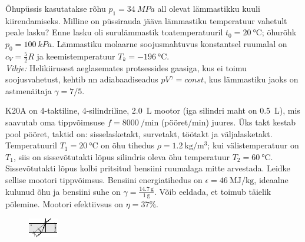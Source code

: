 \documentclass[10pt]{article}
\begin{document}

Õhupüssis kasutatakse rõhu $p_1=\SI{34}{MPa}$ all olevat lämmastikku kuuli kiirendamiseks. Milline on püssirauda jääva lämmastiku temperatuur vahetult peale lasku? Enne lasku oli surulämmastik toatemperatuuril $t_0=\SI{20}\celsius$; õhurõhk $p_0=\SI{100}{kPa}$. Lämmastiku molaarne soojusmahtuvus konstantsel ruumalal on $c_V=\frac 52R$ ja keemistemperatuur $T_k=\SI{-196}\celsius$. \\
\textit{Vihje:} Helikiirusest aeglasemates protsessides gaasiga, kus ei toimu soojusvahetust, kehtib nn adiabaadiseadus $pV^\gamma=const$, kus lämmastiku jaoks on astmenäitaja $\gamma=7/5$.
\probend
\bigskip


K20A on 4-taktiline, 4-silindriline, \SI{2,0}{\liter} mootor (iga silindri maht on \SI{0,5}{\liter}), mis saavutab oma tippvõimsuse $f= \SI{8000}{\per\minute}$ (pööret/min) juures. Üks takt kestab pool pööret, taktid on: sisselasketakt, survetakt, töötakt ja väljalasketakt.
Temperatuuril $T_1=\SI{20}\celsius$ on õhu tihedus $\rho=\SI{1.2}{\kg\per\m\cubed}$; kui välistemperatuur on $T_1$, siis on sissevõtutakti lõpus silindris oleva õhu temperatuur $T_2=\SI{60}\celsius$.  Sissevõtutakti lõpus kolbi pritsitud bensiini ruumalaga mitte arvestada. Leidke sellise mootori tippvõimsus.
Bensiini energiatihedus on $\epsilon = \SI{46}{\mega\joule\per\kilogram}$, ideaalne kulunud õhu ja bensiini suhe on $\gamma = \frac{\SI{14,7}{\gram}}{\SI{1}{\gram}}$. Võib eeldada, et toimub täielik põlemine. Mootori efektiivsus on $\eta=37\%$.
\probend
\bigskip


\begin{figure}
  \vspace{-2em}
  \begin{center}
    \includegraphics[width=1\linewidth]{2023-v2g-06-yl.pdf}
  \end{center}
  \vspace{-2em}
\end{figure}
\end{document}
